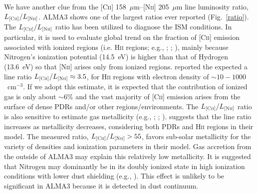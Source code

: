 \documentclass[apj]{emulateapj}
\begin{document}
We have another clue from the \textsc{[Cii]} 158~$\mu$m--\textsc{[Nii]} 205~$\mu$m line luminosity ratio, $L_\textsc{[Cii]}/L_\textsc{[Nii]}$.
ALMA3 shows one of the largest ratios ever reported (Fig.~\ref{ratio}).
The $L_\textsc{[Cii]}/L_\textsc{[Nii]}$ ratio has been utilized to diagnose the ISM conditions.
In particular, it is used to evaluate global trend on the fraction of \textsc{[Cii]} emission associated with ionized regions (i.e. \textsc{Hii} regions; e.g., \citealt{2006ApJ...652L.125O}; \citealt{2014ApJ...782L..17D};  \citealt{2016arXiv160702520P}), mainly because Nitrogen's ionization potential (14.5~eV) is higher than that of Hydrogen (13.6~eV) so that \textsc{[Nii]} arises only from ionized regions.
\citet{2016arXiv160702520P} reported the expected a line ratio $L_\textsc{[Cii]}/L_\textsc{[Nii]}\approx3.5$, for \textsc{Hii} regions with electron density of $\sim10-1000$~cm$^{-3}$.
If we adopt this estimate, it is expected that the contribution of ionized gas is only about $\sim$6\% and the vast majority of \textsc{[Cii]} emission arises from the surface of dense PDRs and/or other regions/environments.
The $L_\textsc{[Cii]}/L_\textsc{[Nii]}$ ratio is also sensitive to estimate gas metallicity (e.g., \citealt{2012A&A...542L..34N}; \citealt{2016A&A...586L...7B}; \citealt{2016arXiv160702520P}).
\citet{2012A&A...542L..34N} suggests that the line ratio increases as metallicity decreases, considering both PDRs and \textsc{Hii} regions in their model.
The measured ratio, $L_\textsc{[Cii]}/L_\textsc{[Nii]}>55$, favors sub-solar metallicity for the variety of densities and ionization parameters in their model. 
Gas accretion from the outside of ALMA3 may explain this relatively low metallicity.
%
It is suggested that Nitrogen may dominantly be in its doubly ionized state in high ionization conditions with lower dust shielding (e.g., \citealt{2016arXiv160702520P}).
This effect is unlikely to be significant in ALMA3 because it is detected in dust continuum.
\end{document}
